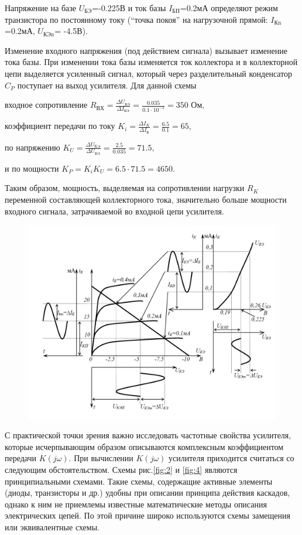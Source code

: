 Напряжение на базе $U_{\text{БЭ}}$=-0.225В и ток базы $I_{\text{БП}}$=0.2мА
определяют режим транзистора по постоянному току (“точка покоя” на нагрузочной прямой: $I_{\text{Кn}}$=0.2мА, $U_{\text{КЭn}}$= -4.5В).

Изменение входного напряжения (под действием сигнала) вызывает изменение тока базы. При изменении тока базы изменяется ток коллектора и в коллекторной цепи выделяется
усиленный сигнал, который через разделительный конденсатор $C_P$ поступает на выход усилителя. Для данной схемы

входное сопротивление $R_{\text{ВХ}}=\frac{\Delta U_{\text{БЭ}}}{\Delta I_{\text{БЭ}}}=\frac{0.035}{0.1\cdot10^{-3}}=350 \text{ Ом},$

коэффициент передачи по току $K_i=\frac{\Delta I_K}{\Delta I_{\text{Б}}}=\frac{6.5}{0.1}=65,$

по напряжению $K_U=\frac{\Delta U_{\text{KЭ}}}{\Delta U_{\text{БЭ}}}=\frac{2.5}{0.035}=71.5,$

и по мощности $K_P=K_i K_U=6.5\cdot 71.5=4650.$

Таким образом, мощность, выделяемая на сопротивлении нагрузки $R_K$ переменной составляющей коллекторного тока, значительно больше мощности входного сигнала, затрачиваемой во входной цепи усилителя.

\begin{figure}[h]
	\centering
	\includegraphics[width=\linewidth]{fig/fig3}
	\caption{}
	\label{fig:3}
\end{figure}

С практической точки зрения важно исследовать частотные свойства усилителя, которые исчерпывающим образом описываются комплексным коэффициентом передачи $K(j\omega)$. При вычислении $K(j\omega)$ усилителя приходится считаться со следующим обстоятельством. Схемы рис.\ref{fig:2} и \ref{fig:4} являются принципиальными схемами. Такие схемы, содержащие активные элементы (диоды, транзисторы и др.) удобны при описании принципа действия каскадов, однако к ним не приемлемы известные математические методы описания электрических цепей. По этой причине широко используются схемы замещения или эквивалентные схемы.

